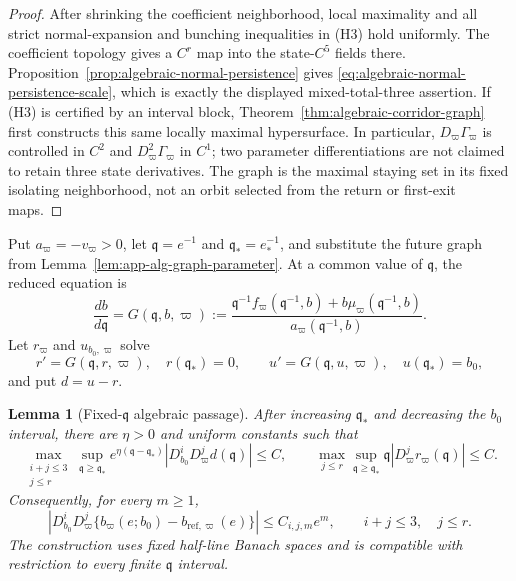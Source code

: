 \documentclass[11pt]{amsart}
\numberwithin{equation}{section}
\newtheorem{lemma}[theorem]{Lemma}
\theoremstyle{definition}
\theoremstyle{remark}
\begin{document}
\begin{proof}
After shrinking the coefficient neighborhood, local maximality and all
strict normal-expansion and bunching inequalities in \textup{(H3)} hold
uniformly.  The coefficient topology gives a $C^r$ map into the
state-$C^5$ fields there.  Proposition~\ref{prop:algebraic-normal-persistence}
gives \eqref{eq:algebraic-normal-persistence-scale}, which is exactly the
displayed mixed-total-three assertion.  If \textup{(H3)} is certified by
an interval block, Theorem~\ref{thm:algebraic-corridor-graph} first
constructs this same locally maximal hypersurface.  In particular,
$D_\varpi\Gamma_\varpi$ is controlled in $C^2$ and
$D_\varpi^2\Gamma_\varpi$ in $C^1$; two parameter differentiations are
not claimed to retain three state derivatives.  The graph is the maximal staying
set in its fixed isolating neighborhood, not an orbit selected from the
return or first-exit maps.
\end{proof}

Put $a_\varpi=-v_\varpi>0$, let
$\mathfrak q=e^{-1}$ and $\mathfrak q_*=e_*^{-1}$, and substitute the
future graph from Lemma~\ref{lem:app-alg-graph-parameter}.  At a common
value of $\mathfrak q$, the reduced equation is
\begin{equation}\label{eq:app-alg-q-equation}
 \frac{db}{d\mathfrak q}=G(\mathfrak q,b,\varpi)
 :=\frac{\mathfrak q^{-1}f_\varpi(\mathfrak q^{-1},b)
       +b\mu_\varpi(\mathfrak q^{-1},b)}
       {a_\varpi(\mathfrak q^{-1},b)}.
\end{equation}
Let $r_\varpi$ and $u_{b_0,\varpi}$ solve
\begin{equation}\label{eq:app-alg-reference-and-orbit}
 r'=G(\mathfrak q,r,\varpi),\quad r(\mathfrak q_*)=0,
 \qquad
 u'=G(\mathfrak q,u,\varpi),\quad u(\mathfrak q_*)=b_0,
\end{equation}
and put $d=u-r$.

\begin{lemma}[Fixed-$\mathfrak q$ algebraic passage]
\label{lem:app-alg-phase}
After increasing $\mathfrak q_*$ and decreasing the $b_0$ interval, there
are $\eta>0$ and uniform constants such that
\begin{equation}\label{eq:app-alg-mixed-flat}
 \max_{\substack{i+j\le3\\j\le r}}
 \sup_{\mathfrak q\ge\mathfrak q_*}
 e^{\eta(\mathfrak q-\mathfrak q_*)}
 |D_{b_0}^iD_\varpi^jd(\mathfrak q)|\le C,
 \qquad
 \max_{j\le r}\sup_{\mathfrak q\ge\mathfrak q_*}
 \mathfrak q|D_\varpi^jr_\varpi(\mathfrak q)|\le C.
\end{equation}
Consequently, for every $m\ge1$,
\begin{equation}\label{eq:app-same-e-flat}
 \left|D_{b_0}^iD_\varpi^j
 \{b_\varpi(e;b_0)-b_{\mathrm{ref},\varpi}(e)\}\right|
 \le C_{i,j,m}e^m,
 \qquad i+j\le3,\quad j\le r.
\end{equation}
The construction uses fixed half-line Banach spaces and is compatible with
restriction to every finite $\mathfrak q$ interval.
\end{lemma}
\end{document}
